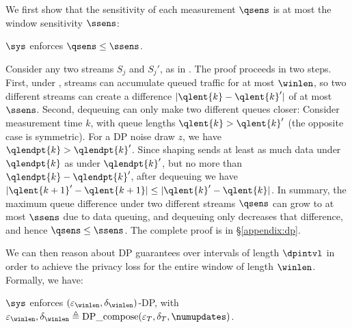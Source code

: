 We first show that the sensitivity of each measurement $\qsens$ is at most the
window sensitivity $\ssens$:
\begin{proposition}\label{prop:sensitivity}
    {$\sys$} enforces $\qsens \leq \ssens$.
\end{proposition}

\begin{proofsketch}
  Consider any two streams $S_j$ and $S_j'$, as in .
  The proof proceeds in two steps. First, under ,
  streams can accumulate queued traffic for at most {$\winlen$}, so two
  different streams can create a difference $|\qlent{k} - \qlent{k}'|$ of at
  most $\ssens$.
  Second, dequeuing can only make two different queues closer: Consider
  measurement time $k$, with queue lengths $\qlent{k} > \qlent{k}'$ (the
  opposite case is symmetric).
  For a DP noise draw $z$, we have $\qlendpt{k} > \qlendpt{k}'$. Since shaping
  sends at least as much data under $\qlendpt{k}$ as under $\qlendpt{k}'$,
  but no more than $\qlendpt{k} - \qlendpt{k}'$, after dequeuing we have
  $|\qlent{k+1}' - \qlent{k+1}| \leq |\qlent{k}' - \qlent{k}|$.
  In summary, the maximum queue difference under two different streams
  $\qsens$ can grow to at most $\ssens$ due to data queuing, and dequeuing only
  decreases that difference, and hence $\qsens \leq \ssens$.  The complete proof
  is in \S\ref{appendix:dp}.
\end{proofsketch}

We can then reason about DP guarantees over intervals of length $\dpintvl$ in
order to achieve the privacy loss for the entire window of length $\winlen$.
%
Formally, we have:
\begin{proposition}\label{prop:dp}
  {$\sys$} enforces $(\varepsilon_{\winlen}, \delta_{\winlen})$-DP, with
  $\varepsilon_{\winlen}, \delta_{\winlen} \triangleq
  \textrm{DP\_compose}(\varepsilon_T, \delta_T, \numupdates)$.
\end{proposition}

